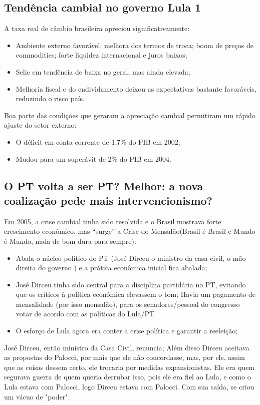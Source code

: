 \documentclass[a4paper,12pt]{article}[abntex2]
\begin{document}
\subsection{\textbf{Tendência cambial no governo Lula 1}}
A taxa real de câmbio brasileira apreciou significativamente:

\begin{itemize}
    \item Ambiente externo favorável: melhora dos termos de troca; boom de preços de commodities; forte liquidez internacional e juros baixos;
    \item Selic em tendência de baixa no geral, mas ainda elevada;
    \item Melhoria fiscal e do endividamento deixou as expectativas bastante favoráveis, reduzindo o risco país.
\end{itemize}

Boa parte das condições que geraram a apreciação cambial permitiram um rápido ajuste do setor externo:

\begin{itemize}
    \item O déficit em conta corrente de 1,7\% do PIB em 2002;
    \item Mudou para um superávit de 2\% do PIB em 2004.
\end{itemize}

\subsection{\textbf{O PT volta a ser PT? Melhor: a nova coalização pede mais intervencionismo?}}

Em 2005, a crise cambial tinha sido resolvida e o Brasil mostrava forte crescimento econômico, mas ``surge'' a Crise do Mensalão(Brasil é Brasil e Mundo é Mundo, nada de bom dura para sempre): \begin{itemize}
    \item Abala o núcleo político do PT (José Dirceu o ministro da casa civil, o mão direita do governo ) e a prática econômica inicial fica abalada;
    \item José Dirceu tinha sido central para a disciplina partidária no PT, evitando que os críticos à política econômica elevassem o tom; Havia um pagamento de mensalidade (por isso mensalão), para os senadores/pessoal do congresso votar de acordo com as políticas do Lula/PT
    \item O esforço de Lula agora era conter a crise política e garantir a reeleição;
\end{itemize}
José Dirceu, então ministro da Casa Civil, renuncia; Além disso Dirceu aceitava as propostas do Palocci, por mais que ele não concordasse, mas, por ele, assim que as coisas dessem certo, ele trocaria por medidas expansionistas. Ele era quem segurava guerra de quem queria derrubar isso, pois ele era fiel ao Lula, e como o Lula estava com Palocci, logo Dirceu estava com Palocci. Com sua saída, se criou um vácuo de "poder".
\end{document}
